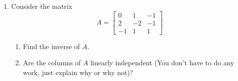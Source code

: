 \documentclass[14pt]{amsart}
\begin{document}
\begin{enumerate}
\item  Consider the matrix
%
\begin{equation*}
A = \begin{bmatrix}
0 & 1 & -1\\
2 & -2 & -1\\
-1 & 1 & 1
\end{bmatrix}
\end{equation*}

\begin{enumerate}

\item  Find the inverse of $A$.

\item  Are the columns of $A$ linearly independent (You don't have to do any work, just explain why or why not)?

\end{enumerate}

\end{enumerate}
\end{document}
